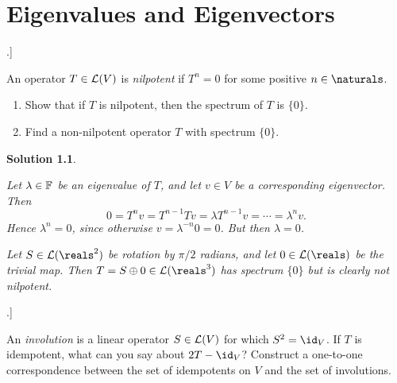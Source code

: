 \documentclass[article, a4paper, 11pt, oneside]{memoir}
\numberwithin{equation}{chapter}
\renewenvironment{exerciseframed}[1][]{%
    \setsepchar{.}%
    \readlist*\mylist{#1}%
    \def\exlabel{\mylist[1].\mylist[2]}%
    \begin{exerciseframed*}[\exlabel]%
    \label{ex:#1}%
}{%
    \end{exerciseframed*}%
}
\theoremstyle{nonumberplain}
\newtheorem{solution}{Solution}
\begin{document}
\addtocounter{chapter}{4}
\chapter{Eigenvalues and Eigenvectors}

\newcommand{\calV}{\mathcal{V}}
\newcommand{\mr}[3]{{}_{#1}[#2]_{#3}}
\newcommand{\spec}{\operatorname{Spec}}

\begin{exerciseframed}[8.6]
    An operator $T \in \mathcal{L}(V)$ is \emph{nilpotent} if $T^n = 0$ for some positive $n \in \naturals$.
    \begin{enumerate}
        \item Show that if $T$ is nilpotent, then the spectrum of $T$ is $\{0\}$.
        
        \item Find a non-nilpotent operator $T$ with spectrum $\{0\}$.
    \end{enumerate}
\end{exerciseframed}

\begin{solution}
\begin{solutionsec}
    \item Let $\lambda \in \mathbb{F}$ be an eigenvalue of $T$, and let $v \in V$ be a corresponding eigenvector. Then
    \begin{equation*}
        0
            = T^n v
            = T^{n-1} Tv
            = \lambda T^{n-1}v
            = \cdots
            = \lambda^n v.
    \end{equation*}
    Hence $\lambda^n = 0$, since otherwise $v = \lambda^{-n} 0 = 0$. But then $\lambda = 0$.

    \item Let $S \in \calL(\reals^2)$ be rotation by $\pi/2$ radians, and let $0 \in \calL(\reals)$ be the trivial map. Then $T = S \oplus 0 \in \calL(\reals^3)$ has spectrum $\{0\}$ but is clearly not nilpotent.
\end{solutionsec}
\end{solution}


\begin{exerciseframed}[8.9]
    An \emph{involution} is a linear operator $S \in \mathcal{L}(V)$ for which $S^2 = \id_V$. If $T$ is idempotent, what can you say about $2T - \id_V$? Construct a one-to-one correspondence between the set of idempotents on $V$ and the set of involutions.
\end{exerciseframed}
\end{document}
